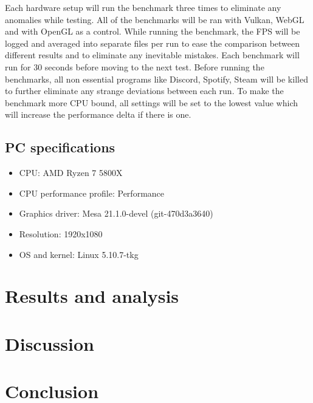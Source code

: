 \documentclass{article}
\begin{document}
Each hardware setup will run the benchmark three times to eliminate any anomalies while testing. All of the benchmarks will be ran with Vulkan, WebGL and with OpenGL as a control. While running the benchmark, the FPS will be logged and averaged into separate files per run to ease the comparison between different results and to eliminate any inevitable mistakes. Each benchmark will run for 30 seconds before moving to the next test. Before running the benchmarks, all non essential programs like Discord, Spotify, Steam will be killed to further eliminate any strange deviations between each run. To make the benchmark more CPU bound, all settings will be set to the lowest value which will increase the performance delta if there is one.

\subsection {PC specifications}
\begin{itemize}
    \item CPU: AMD Ryzen 7 5800X
    \item CPU performance profile: Performance
    \item Graphics driver: Mesa 21.1.0-devel (git-470d3a3640)
    \item Resolution: 1920x1080
    \item OS and kernel: Linux 5.10.7-tkg
\end{itemize}


\section {Results and analysis}


\section {Discussion}


\section {Conclusion}



\printbibliography[heading=bibintoc,title={References}]
\end{document}
